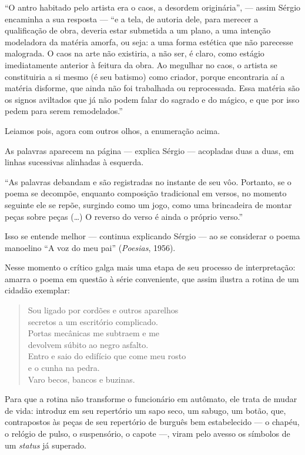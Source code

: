 ``O antro habitado pelo artista era o caos, a desordem originária'', ---
assim Sérgio encaminha a sua resposta --- ``e a tela, de autoria dele,
para merecer a qualificação de obra, deveria estar submetida a um plano,
a uma intenção modeladora da matéria amorfa, ou seja: a uma forma
estética que não parecesse malograda. O caos na arte não existiria, a
não ser, é claro, como estágio imediatamente anterior à feitura da obra.
Ao megulhar no caos, o artista se constituiria a si mesmo (é seu
batismo) como criador, porque encontraria aí a matéria disforme, que
ainda não foi trabalhada ou reprocessada. Essa matéria são os signos
aviltados que já não podem falar do sagrado e do mágico, e que por isso
pedem para serem remodelados.''

Leiamos pois, agora com outros olhos, a enumeração acima.

As palavras aparecem na página --- explica Sérgio --- acopladas duas a duas, em linhas sucessivas alinhadas à
esquerda.

``As palavras debandam e são registradas no instante de seu vôo.
Portanto, se o poema se decompõe, enquanto composição tradicional em
versos, no momento seguinte ele se repõe, surgindo como um jogo, como
uma brincadeira de montar peças sobre peças (\ldots{}) O reverso do verso é
ainda o próprio verso.''

Isso se entende melhor --- continua explicando Sérgio --- ao se considerar
o poema manoelino ``A voz do meu pai'' (\emph{Poesias}, 1956).

Nesse momento o crítico galga mais uma etapa de seu processo de
interpretação: amarra o poema em questão à série conveniente, que assim
ilustra a rotina de um cidadão exemplar:

\begin{verse}
Sou ligado por cordões e outros aparelhos \\
secretos a um escritório complicado. \\[5pt]
Portas mecânicas me subtraem e me \\
devolvem súbito ao negro asfalto. \\[5pt]
Entro e saio do edifício que come meu rosto \\
e o cunha na pedra. \\[5pt]
Varo becos, bancos e buzinas.
\end{verse}

Para que a rotina não transforme o funcionário em autômato, ele trata de
mudar de vida: introduz em seu repertório um sapo seco, um sabugo, um
botão, que, contrapostos às peças de seu repertório de burguês bem
estabelecido --- o chapéu, o relógio de pulso, o suspensório, o capote
---, viram pelo avesso os símbolos de um \emph{status} já superado.

